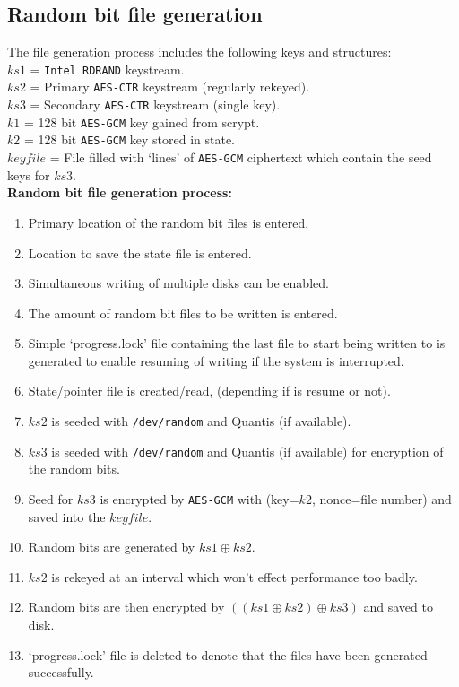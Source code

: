 \documentclass{paper}
\begin{document}
			\subsection{Random bit file generation}
				The file generation process includes the following keys and structures:\\
				$\mathit{ks1}$ = \texttt{Intel RDRAND} keystream.\\
				$\mathit{ks2}$ = Primary \texttt{AES-CTR} keystream (regularly rekeyed).\\
				$\mathit{ks3}$ = Secondary \texttt{AES-CTR} keystream (single key).\\
				$\mathit{k1}$ = 128 bit \texttt{AES-GCM} key gained from scrypt.\\
				$\mathit{k2}$ = 128 bit \texttt{AES-GCM} key stored in state.\\
				$\mathit{keyfile}$ = File filled with `lines' of \texttt{AES-GCM} ciphertext which contain the seed keys for $\mathit{ks3}$.\vspace{1em}\\
				\textbf{Random bit file generation process:}
				\vspace{-0.75em}
				\begin{enumerate}
					\setlength\itemsep{-0.3em}
					\item Primary location of the random bit files is entered.
					\item Location to save the state file is entered.
					\item Simultaneous writing of multiple disks can be enabled.
					\item The amount of random bit files to be written is entered.
					\item Simple `progress.lock' file containing the last file to start being written to is generated to enable resuming of writing if the system is interrupted.
					\item State/pointer file is created/read, (depending if is resume or not).
					\item $\mathit{ks2}$ is seeded with \texttt{/dev/random} and Quantis (if available).
					\item $\mathit{ks3}$ is seeded with \texttt{/dev/random} and Quantis (if available) for encryption of the random bits.
					\item Seed for $\mathit{ks3}$ is encrypted by \texttt{AES-GCM} with (key=$\mathit{k2}$, nonce=file number) and saved into the $\mathit{keyfile}$.
					\item Random bits are generated by $\mathit{ks1} \oplus \mathit{ks2}$.
					\item $\mathit{ks2}$ is rekeyed at an interval which won't effect performance too badly.
					\item Random bits are then encrypted by $((\mathit{ks1} \oplus \mathit{ks2}) \oplus\mathit{ks3})$ and saved to disk.
					\item `progress.lock' file is deleted to denote that the files have been generated successfully.
				\end{enumerate}
			
\end{document}
